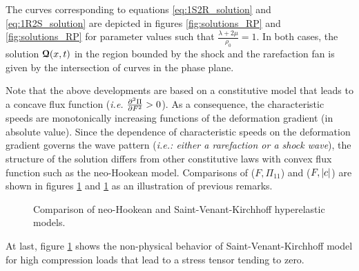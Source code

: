 The curves corresponding to equations \eqref{eq:1S2R_solution} and \eqref{eq:1R2S_solution} are depicted in figures \ref{fig:solutions_RP} and \ref{fig:solutions_RP} for parameter values such that $\frac{\lambda+2\mu}{\rho_0}=1$. In both cases, the solution ${\boldsymbol{\mathcal{Q}}}(x,t)$ in the region bounded by the shock and the rarefaction fan is given by the intersection of curves in the phase plane. 

\begin{remark}
  Note that the above developments are based on a constitutive model that leads to a concave flux function (\textit{i.e. } $\ddrond{\Pi}{F}{F}>0$). As a consequence, the characteristic speeds are monotonically increasing functions of the deformation gradient (in absolute value). Since the dependence of characteristic speeds on the deformation gradient governs the wave pattern (\textit{i.e.: either a rarefaction or a shock wave}), the structure of the solution differs from other constitutive laws with convex flux function such as the neo-Hookean model.
  Comparisons of ($F,\Pi_{11}$) and ($F,\left\vert c\right\vert$) are shown in figures \ref{fig:SVK-NH} and \ref{fig:SVK-NH} as an illustration of previous remarks.
  \begin{figure}[h!]
    \centering
    {  \label{subfig:SVK_NH_Pi}}
    {  \label{subfig:SVK_NH_speeds}}
    \caption{Comparison of neo-Hookean and Saint-Venant-Kirchhoff hyperelastic models.}
    \label{fig:SVK-NH}
  \end{figure}
  At last, figure \ref{fig:SVK-NH} shows the non-physical behavior of Saint-Venant-Kirchhoff model for high compression loads that lead to a stress tensor tending to zero.
\end{remark}


